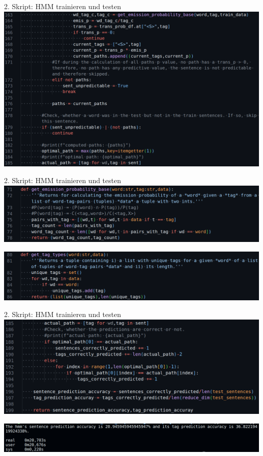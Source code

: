 \documentclass{beamer}
\begin{document}
\begin{frame}[t]{2. Skript: HMM trainieren und testen}
	\includegraphics[scale=0.43]{"./pics/hmm_script_pics/12.png"}
\end{frame}

\begin{frame}[t]{2. Skript: HMM trainieren und testen}
	\includegraphics[scale=0.43]{"./pics/hmm_script_pics/10.png"}
	
	\medskip
	
	\includegraphics[scale=0.43]{"./pics/hmm_script_pics/09.png"}
\end{frame}

\begin{frame}[t]{2. Skript: HMM trainieren und testen}
	\includegraphics[scale=0.43]{"./pics/hmm_script_pics/13.png"}
	
	\medskip
	
	\includegraphics[scale=0.4]{"./pics/hmm_script_pics/17.png"}
\end{frame}
\end{document}
